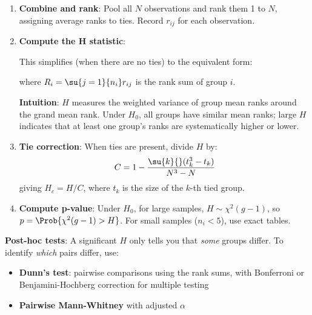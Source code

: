 \begin{enumerate}
    \item \textbf{Combine and rank}: Pool all $N$ observations and rank them 1 to $N$,
        assigning average ranks to ties. Record $r_{ij}$ for each observation.

    \item \textbf{Compute the H statistic}:
        \begin{center}
        \end{center}

        This simplifies (when there are no ties) to the equivalent form:
        \begin{center}
        \end{center}
        where $R_i = \su{j=1}{n_i}r_{ij}$ is the rank sum of group $i$.

        \textbf{Intuition}: $H$ measures the weighted variance of group mean ranks around
        the grand mean rank. Under $H_0$, all groups have similar mean ranks; large $H$
        indicates that at least one group's ranks are systematically higher or lower.

    \item \textbf{Tie correction}: When ties are present, divide $H$ by:
        $$C = 1 - \dfrac{\su{k}{}(t_k^3 - t_k)}{N^3 - N}$$
        giving $H_c = H / C$, where $t_k$ is the size of the $k$-th tied group.

    \item \textbf{Compute p-value}: Under $H_0$, for large samples,
        $H \sim \chi^2(g-1)$, so $p = \Prob{\chi^2(g-1) > H}$.
        For small samples ($n_i < 5$), use exact tables.
\end{enumerate}

\textbf{Post-hoc tests}: A significant $H$ only tells you that \emph{some} groups differ.
To identify \emph{which} pairs differ, use:
\begin{itemize}
    \item \textbf{Dunn's test}: pairwise comparisons using the rank sums, with
        Bonferroni or Benjamini-Hochberg correction for multiple testing
    \item \textbf{Pairwise Mann-Whitney} with adjusted $\alpha$
\end{itemize}

